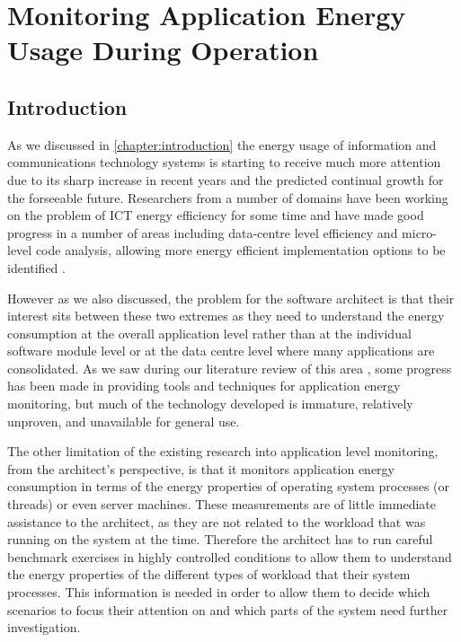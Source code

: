 \chapter{Monitoring Application Energy Usage During Operation}
\label{chapter:monitoring}

\section{Introduction}

As we discussed in \cref{chapter:introduction} the energy usage of information and communications technology systems is starting to receive much more attention due to its sharp increase in recent years and the predicted continual growth for the forseeable future.  Researchers from a number of domains have been working on the problem of ICT energy efficiency for some time and have made good progress in a number of areas including data-centre level efficiency \cite{dayarathna2016-dcenergy} and micro-level code analysis, allowing more energy efficient implementation options to be identified \cite{noureddine2015-hotspots}.

However as we also discussed, the problem for the software architect is that their interest sits between these two extremes as they need to understand the energy consumption at the overall application level rather than at the individual software module level or at the data centre level where many applications are consolidated.  As we saw during our literature review of this area , some progress has been made in providing tools and techniques for application energy monitoring, but much of the technology developed is immature, relatively unproven, and unavailable for general use.

The other limitation of the existing research into application level monitoring, from the architect's perspective, is that it monitors application energy consumption in terms of the energy properties of operating system processes (or threads) or even server machines.  These measurements are of little immediate assistance to the architect, as they are not related to the workload that was running on the system at the time. Therefore the architect has to run careful benchmark exercises in highly controlled conditions to allow them to understand the energy properties of the different types of workload that their system processes. This information is needed in order to allow them to decide which scenarios to focus their attention on and which parts of the system need further investigation.

